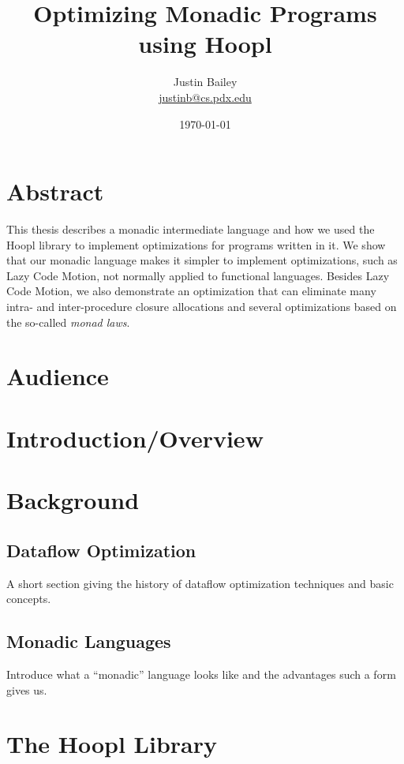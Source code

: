 \documentclass[11pt]{article}
\title{Optimizing Monadic Programs using Hoopl}
\author{Justin Bailey \\ \url{justinb@cs.pdx.edu}}
\date{\today}
\begin{document}
\VerbatimFootnotes
\DefineShortVerb{\#}
\doublespacing

\maketitle

\section{Abstract}

This thesis describes a monadic intermediate language and how we used
the Hoopl library to implement optimizations for programs written in
it. We show that our monadic language makes it simpler to
implement optimizations, such as Lazy Code Motion, not normally applied
to functional languages. Besides Lazy Code Motion, we also demonstrate an optimization
that can eliminate many intra- and inter-procedure closure allocations and several
optimizations based on the so-called \emph{monad laws}.

\section{Audience}

\section{Introduction/Overview}


\section{Background}
\subsection{Dataflow Optimization}

A short section giving the history of dataflow optimization techniques
and basic concepts.

\subsection{Monadic Languages}

Introduce what a ``monadic'' language looks like and the advantages such a form
gives us.

\section{The Hoopl Library}
\end{document}
